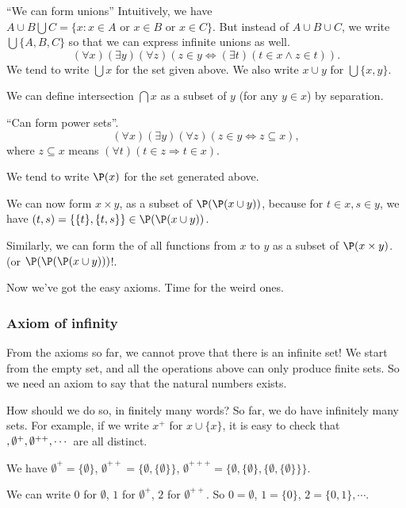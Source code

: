 \documentclass[a4paper]{article}
\begin{document}
\begin{axiom}
  ``We can form unions'' Intuitively, we have $A\cup B\bigcup C = \{x: x\in A \text{ or }x\in B\text{ or }x\in C\}$. But instead of $A\cup B\cup C$, we write $\bigcup\{A, B, C\}$ so that we can express infinite unions as well.
  \[
    (\forall x)(\exists y)(\forall z)(z\in y \Leftrightarrow (\exists t)(t\in x \wedge z\in t)).
  \]
  We tend to write $\bigcup x$ for the set given above. We also write $x\cup y$ for $\bigcup\{x, y\}$.
\end{axiom}

We can define intersection $\bigcap x$ as a subset of $y$ (for any $y\in x$) by separation.
\begin{axiom}
  ``Can form power sets''.
  \[
    (\forall x)(\exists y)(\forall z)(z\in y \Leftrightarrow z\subseteq x),
  \]
  where $z\subseteq x$ means $(\forall t)(t\in z \Rightarrow t\in x)$.

  We tend to write $\P(x)$ for the set generated above.
\end{axiom}
We can now form $x\times y$, as a subset of $\P(\P(x\cup y))$, because for $t\in x, s\in y$, we have $(t, s) = \{\{t\},\{t, s\}\}\in \P(\P(x\cup y))$.

Similarly, we can form the of all functions from $x$ to $y$ as a subset of $\P(x\times y)$. (or $\P(\P(\P(x\cup y)))$!.

Now we've got the easy axioms. Time for the weird ones.

\subsubsection*{Axiom of infinity}
From the axioms so far, we cannot prove that there is an infinite set! We start from the empty set, and all the operations above can only produce finite sets. So we need an axiom to say that the natural numbers exists.

How should we do so, in finitely many words? So far, we do have infinitely many sets. For example, if we write $x^+$ for $x\cup \{x\}$, it is easy to check that $\empty, \emptyset^+, \emptyset^{++}, \cdots$ are all distinct.

\note We have $\emptyset^+ = \{\emptyset\}$, $\emptyset^{++} = \{\emptyset, \{\emptyset\}\}$, $\emptyset^{+++} = \{\emptyset, \{\emptyset\}, \{\emptyset, \{\emptyset\}\}\}$.

We can write $0$ for $\emptyset$, $1$ for $\emptyset^{+}$, $2$ for $\emptyset^{++}$. So $0 = \emptyset$, $1 = \{0\}$, $2 = \{0, 1\}, \cdots$.
\end{document}

